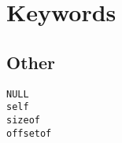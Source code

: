 \chapter{Keywords}






\section{Other}

\begin{lstlisting}
NULL
self
sizeof
offsetof
\end{lstlisting}
